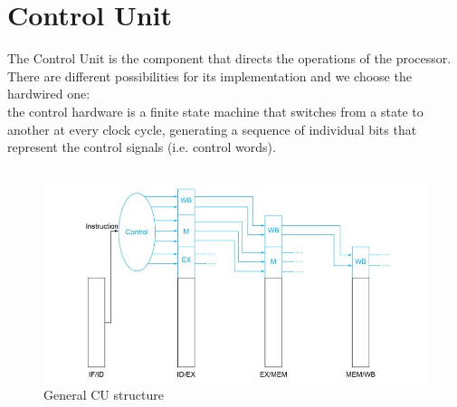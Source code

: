 \chapter{Control Unit}
The Control Unit is the component that directs the operations of the processor. \\
There are different possibilities for its implementation and we choose the hardwired one: \\
the control hardware is a finite state machine that switches from a state to another at every clock cycle, generating a sequence of individual bits that represent the control signals (i.e. control words). \\
\\
\begin{figure}[h!]
	\centering
	\includegraphics[width=12cm]{./images/structure_CU}
	\caption{General CU structure}
	\label{fig3.1}
\end{figure}

